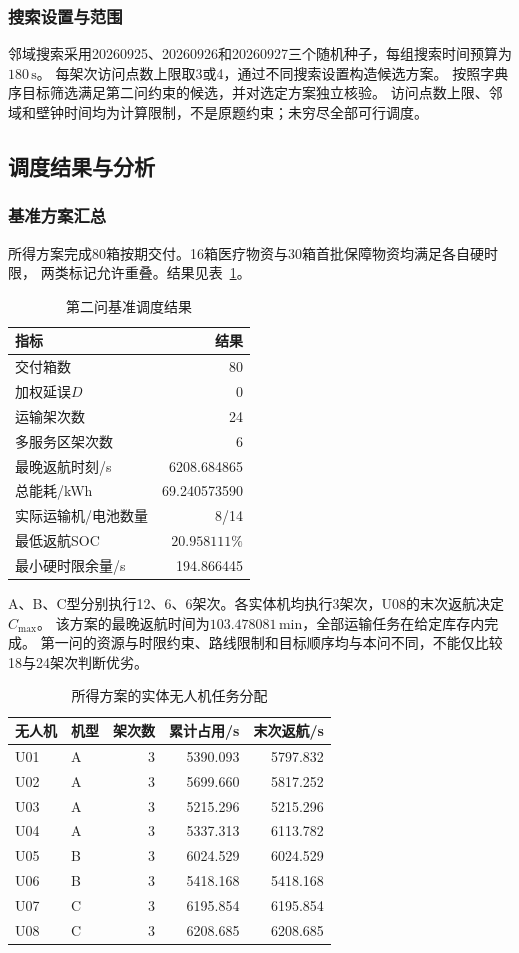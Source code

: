 \documentclass[bwprint]{gmcmthesis}
\begin{document}
\subsubsection{搜索设置与范围}
邻域搜索采用20260925、20260926和20260927三个随机种子，每组搜索时间预算为$180\,\mathrm{s}$。
每架次访问点数上限取3或4，通过不同搜索设置构造候选方案。
按照字典序目标筛选满足第二问约束的候选，并对选定方案独立核验。
访问点数上限、邻域和壁钟时间均为计算限制，不是原题约束；未穷尽全部可行调度。

\subsection{调度结果与分析}
\subsubsection{基准方案汇总}
所得方案完成80箱按期交付。16箱医疗物资与30箱首批保障物资均满足各自硬时限，
两类标记允许重叠。结果见表~\ref{tab:q2_summary}。
\begin{table}[htbp]
\centering
\small
\caption{第二问基准调度结果}
\label{tab:q2_summary}
\begin{tabular}{lr}
\toprule
指标 & 结果 \\
\midrule
交付箱数 & 80 \\
加权延误$D$ & 0 \\
运输架次数 & 24 \\
多服务区架次数 & 6 \\
最晚返航时刻/s & 6208.684865 \\
总能耗/kWh & 69.240573590 \\
实际运输机/电池数量 & 8/14 \\
最低返航SOC & $20.958111\%$ \\
最小硬时限余量/s & 194.866445 \\
\bottomrule
\end{tabular}
\end{table}
A、B、C型分别执行12、6、6架次。各实体机均执行3架次，U08的末次返航决定$C_{\max}$。
该方案的最晚返航时间为$103.478081\,\mathrm{min}$，全部运输任务在给定库存内完成。
第一问的资源与时限约束、路线限制和目标顺序均与本问不同，不能仅比较18与24架次判断优劣。
\begin{table}[htbp]
\centering
\small
\caption{所得方案的实体无人机任务分配}
\label{tab:q2_units}
\begin{tabular}{llrrr}
\toprule
无人机 & 机型 & 架次数 & 累计占用/s & 末次返航/s \\
\midrule
U01 & A & 3 & 5390.093 & 5797.832 \\
U02 & A & 3 & 5699.660 & 5817.252 \\
U03 & A & 3 & 5215.296 & 5215.296 \\
U04 & A & 3 & 5337.313 & 6113.782 \\
U05 & B & 3 & 6024.529 & 6024.529 \\
U06 & B & 3 & 5418.168 & 5418.168 \\
U07 & C & 3 & 6195.854 & 6195.854 \\
U08 & C & 3 & 6208.685 & 6208.685 \\
\bottomrule
\end{tabular}
\end{table}
\end{document}
